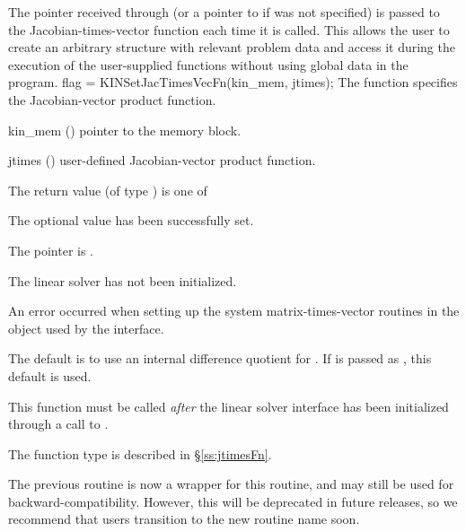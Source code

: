 The pointer  received through  (or a
pointer to  if  was not specified) is passed
to the Jacobian-times-vector function  each time it is
called.  This allows the user to create an arbitrary structure with
relevant problem data and access it during the execution of the
user-supplied functions without using global data in the program.
{
  flag = KINSetJacTimesVecFn(kin\_mem, jtimes);
}
{
  The function  specifies the Jacobian-vector
  product function.
}
{
  \begin{args}
  \item[kin\_mem] ()
    pointer to the {\kinsol} memory block.
  \item[jtimes] ()
    user-defined Jacobian-vector product function.
  \end{args}
}
{
  The return value  (of type ) is one of
  \begin{args}
  \item[\Id{KINLS\_SUCCESS}]
    The optional value has been successfully set.
  \item[\Id{KINLS\_MEM\_NULL}]
    The  pointer is .
  \item[\Id{KINLS\_LMEM\_NULL}]
    The {\kinls} linear solver has not been initialized.
  \item[\Id{KINLS\_SUNLS\_FAIL}]
    An error occurred when setting up the system matrix-times-vector
    routines in the {\sunlinsol} object used by the {\kinls}
    interface.
  \end{args}
}
{
  The default is to use an internal difference quotient for
  .  If  is passed as , this default
  is used.

  This function must be called \emph{after} the {\kinls} linear solver
  interface has been initialized through a call to
  .

  The function type  is described in \S\ref{ss:jtimesFn}.

  The previous routine  is now a wrapper for
  this routine, and may still be used for backward-compatibility.
  However, this will be deprecated in future releases, so we recommend
  that users transition to the new routine name soon.
}



